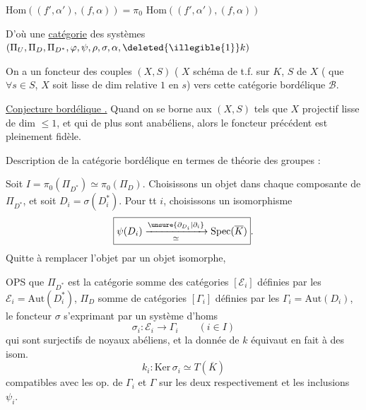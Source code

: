 $\mathrm{Hom}((f',\alpha'),(f,\alpha))=\pi_0$
\uline{$\mathrm{Hom}$}$((f',\alpha'),(f,\alpha))$

D'où une \uline{catégorie} des
 systèmes
$(\Pi_U,\Pi_D,\Pi_{D^*},\varphi,\psi,\rho,\sigma,\alpha,
\deleted{\illegible{1}}k)$

On a un foncteur des couples $(X,S)$
( $X$ schéma  de t.f. sur $K$,
$S$ \uline{} 
  de $X$
 ( que $\forall s\in S$, $X$
soit lisse de dim relative $1$ en $s$)
vers cette catégorie bordélique $\mathcal B$.


\uline{Conjecture bordélique .}
Quand on se borne aux $(X,S)$ tels que $X$ projectif lisse de dim
$\leq 1$, et qui de plus sont anabéliens, alors le foncteur
précédent est pleinement fidèle.


Description de la catégorie bordélique en termes de théorie des groupes :

Soit $I=\pi_0(\Pi_{D^*})\simeq\pi_0(\Pi_D)$.
Choisissons un objet  dans chaque composante de
$\Pi_{D^*}$, et soit $D_i=\sigma(D_i^*)$.
Pour tt $i$, choisissons un isomorphisme
\[
\boxed{\psi(D_i)\xrightarrow[\simeq]{\unsure{\partial_{D_i}|\partial_i}}
\mathrm{Spec}(\overline K)}.
\]
Quitte à remplacer l'objet par un  objet isomorphe,

OPS que $\Pi_{D^*}$ est la catégorie somme des catégories
$[\mathcal E_i]$ définies par les
$\mathcal E_i=\mathrm{Aut}(D_i^*)$, $\Pi_D$
 
somme de catégories $[\Gamma_i]$ définies par les
$\Gamma_i=\mathrm{Aut}(D_i)$, le foncteur $\sigma$ s'exprimant
par un système d'homs
\[
\sigma_i:\mathcal E_i\to\Gamma_i\qquad(i\in I)
\]
qui sont surjectifs de noyaux abéliens,
et la donnée de $k$ équivaut en fait à des isom.
\[
k_i:\mathrm{Ker}\,\sigma_i\simeq T(\overline K)
\]
compatibles avec les op. de $\Gamma_i$ et $\Gamma$ sur les deux
 respectivement et les inclusions $\psi_i$.

